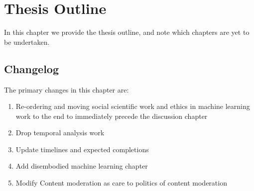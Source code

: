 \chapter{Thesis Outline}
\label{chap:ddp}

\ifpdf
    \graphicspath{{Outline/Figs/Raster/}{Outline/Figs/PDF/}{Outline/Figs/}}
\else
    \graphicspath{{Outline/Figs/Vector/}{Outline/Figs/}}
\fi

In this chapter we provide the thesis outline, and note which chapters are yet to be undertaken.
\section{Changelog}
The primary changes in this chapter are:
\begin{enumerate}
    \item Re-ordering and moving social scientific work and ethics in machine learning work to the end to immediately precede the discussion chapter
    \item Drop temporal analysis work
    \item Update timelines and expected completions
    \item Add disembodied machine learning chapter
    \item Modify Content moderation as care to politics of content moderation
\end{enumerate}
